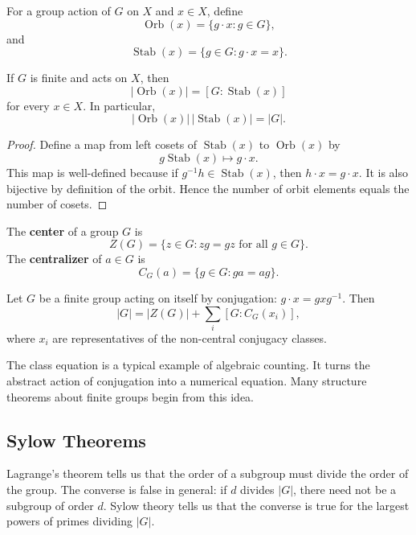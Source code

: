 \begin{definition}
For a group action of $G$ on $X$ and $x\in X$, define
\[
    \operatorname{Orb}(x)=\{g\cdot x:g\in G\},
\]
and
\[
    \operatorname{Stab}(x)=\{g\in G:g\cdot x=x\}.
\]
\end{definition}

\begin{theorem}
If $G$ is finite and acts on $X$, then
\[
    |\operatorname{Orb}(x)|=[G:\operatorname{Stab}(x)]
\]
for every $x\in X$. In particular,
\[
    |\operatorname{Orb}(x)|\,|\operatorname{Stab}(x)|=|G|.
\]
\end{theorem}

\begin{proof}
Define a map from left cosets of $\operatorname{Stab}(x)$ to $\operatorname{Orb}(x)$ by
\[
    g\operatorname{Stab}(x)\mapsto g\cdot x.
\]
This map is well-defined because if $g^{-1}h\in\operatorname{Stab}(x)$, then $h\cdot x=g\cdot x$. It is also bijective by definition of the orbit. Hence the number of orbit elements equals the number of cosets.
\end{proof}

\begin{definition}
The \textbf{center} of a group $G$ is
\[
    Z(G)=\{z\in G:zg=gz\text{ for all }g\in G\}.
\]
The \textbf{centralizer} of $a\in G$ is
\[
    C_G(a)=\{g\in G:ga=ag\}.
\]
\end{definition}

\begin{theorem}
Let $G$ be a finite group acting on itself by conjugation: $g\cdot x=gxg^{-1}$. Then
\[
    |G|=|Z(G)|+\sum_i [G:C_G(x_i)],
\]
where $x_i$ are representatives of the non-central conjugacy classes.
\end{theorem}

\begin{remark}
The class equation is a typical example of algebraic counting. It turns the abstract action of conjugation into a numerical equation. Many structure theorems about finite groups begin from this idea.
\end{remark}

\subsection{Sylow Theorems}

Lagrange's theorem tells us that the order of a subgroup must divide the order of the group. The converse is false in general: if $d$ divides $|G|$, there need not be a subgroup of order $d$. Sylow theory tells us that the converse is true for the largest powers of primes dividing $|G|$.

